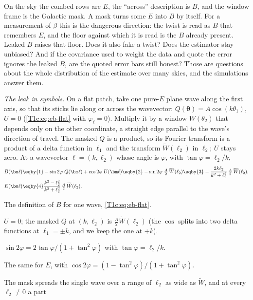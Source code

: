 On the sky the combed rows are $E$, the ``across'' description is $B$, and the window frame is the Galactic mask. A
mask turns some $E$ into $B$ by itself. For a measurement of $\beta$ this is the dangerous direction: the twist is
read as $B$ that remembers $E$, and the floor against which it is read is the $B$ already present. Leaked $B$ raises
that floor. Does it also fake a twist? Does the estimator stay unbiased? And if the covariance used to weight the
data and quote the error ignores the leaked $B$, are the quoted error bars still honest? Those are questions about
the whole distribution of the estimate over many skies, and the simulations answer them.

\emph{The leak in symbols.} On a flat patch, take one pure-$E$ plane wave along the first axis, so that its sticks lie
along or across the wavevector: $Q(\bm\theta)=A\cos(k\theta_1)$, $U=0$ (\cref{T1c:eq:eb-flat} with $\varphi_{\bm\ell}=0$).
Multiply it by a window $W(\theta_2)$ that depends only on the other coordinate, a straight edge parallel to the
wave's direction of travel. The masked $Q$ is a product, so its Fourier transform is a product of a delta function
in $\ell_1$ and the transform $\widetilde W(\ell_2)$ in $\ell_2$; $U$ stays zero. At a wavevector $\bm\ell=(k,\ell_2)$ whose
angle is $\varphi$, with $\tan\varphi=\ell_2/k$,
\begin{align}
  B(\bm\ell)
  &\eqby{1}-\sin2\varphi\;Q(\bm\ell)+\cos2\varphi\;U(\bm\ell)
   \eqby{2}-\sin2\varphi\;\tfrac A2\,\widetilde W(\ell_2)
   \eqby{3}-\frac{2k\ell_2}{k^2+\ell_2^2}\,\tfrac A2\,\widetilde W(\ell_2),
  \nonumber\\
  E(\bm\ell)&\eqby{4}\frac{k^2-\ell_2^2}{k^2+\ell_2^2}\,\tfrac A2\,\widetilde W(\ell_2).
  \label{10c:eq:leak-toy}
\end{align}
\begin{explain}
  \item The definition of $B$ for one wave, \cref{T1c:eq:eb-flat}.
  \item $U=0$; the masked $Q$ at $(k,\ell_2)$ is $\frac A2\widetilde W(\ell_2)$ (the $\cos$ splits into two delta functions at
        $\ell_1=\pm k$, and we keep the one at $+k$).
  \item $\sin2\varphi=2\tan\varphi/(1+\tan^2\varphi)$ with $\tan\varphi=\ell_2/k$.
  \item The same for $E$, with $\cos2\varphi=(1-\tan^2\varphi)/(1+\tan^2\varphi)$.
\end{explain}
The mask spreads the single wave over a range of $\ell_2$ as wide as $\widetilde W$, and at every $\ell_2\neq0$ a part
